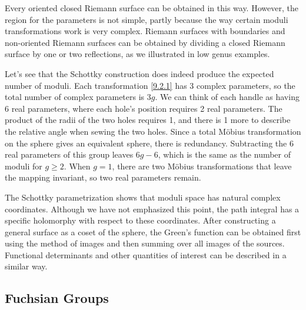Every oriented closed Riemann surface can be obtained in this way. However, the region for the parameters is not simple, partly because the way certain moduli transformations work is very complex. 
Riemann surfaces with boundaries and non-oriented Riemann surfaces can be obtained by dividing a closed Riemann surface by one or two reflections, as we illustrated in low genus examples.

Let's see that the Schottky construction does indeed produce the expected number of moduli.
Each transformation \eqref{9.2.1} has 3 complex parameters, so the total number of complex parameters is $3g$. 
We can think of each handle as having 6 real parameters, where each hole's position requires 2 real parameters. The product of the radii of the two holes requires 1, and there is 1 more to describe the relative angle when sewing the two holes. 
Since a total Möbius transformation on the sphere gives an equivalent sphere, there is redundancy.
Subtracting the 6 real parameters of this group leaves $6g-6$, which is the same as the number of moduli for $g \geq 2$. 
When $g=1$, there are two Möbius transformations that leave the mapping invariant, so two real parameters remain.

The Schottky parametrization shows that moduli space has natural complex coordinates. Although we have not emphasized this point, the path integral has a specific holomorphy with respect to these coordinates. 
After constructing a general surface as a coset of the sphere, the Green's function can be obtained first using the method of images and then summing over all images of the sources. Functional determinants and other quantities of interest can be described in a similar way.
\subsection*{Fuchsian Groups}


